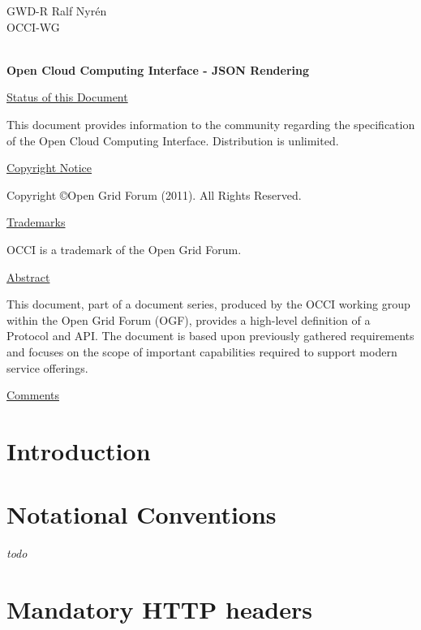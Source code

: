 \documentclass[10pt,a4paper]{article}
\begin{document}
\thispagestyle{empty}

GWD-R \hfill Ralf Nyrén \\
OCCI-WG \\
\\

\vspace*{0.5in}

\begin{Large}
\textbf{Open Cloud Computing Interface - JSON Rendering}
\end{Large}

\vspace*{0.5in}

\underline{Status of this Document}

This document provides information to the community regarding the
specification of the Open Cloud Computing Interface. Distribution is
unlimited.

\underline{Copyright Notice}

Copyright \copyright Open Grid Forum (2011). All Rights Reserved.

\underline{Trademarks}

OCCI is a trademark of the Open Grid Forum.

\underline{Abstract}

This document, part of a document series, produced by the OCCI working
group within the Open Grid Forum (OGF), provides a high-level
definition of a Protocol and API. The document is based upon
previously gathered requirements and focuses on the scope of important
capabilities required to support modern service offerings.

\underline{Comments}
\newcommand{\ralf}[1]{\textcolor{red}{RN: #1}}

\newpage
\tableofcontents
\newpage

\section{Introduction}
%

\section{Notational Conventions}
{\em todo}

\section{Mandatory HTTP headers}
\label{sec:mandatory_headers}
\end{document}
